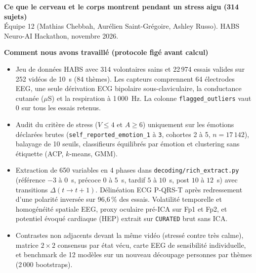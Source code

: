 \documentclass[10pt]{article}
\begin{document}
{\large\bfseries Ce que le cerveau et le corps montrent pendant un stress aigu (314 sujets)}\\[1pt]
{\footnotesize Équipe 12 (Mathias Chebbah, Aurélien Saint-Grégoire, Ashley Russo). HABS Neuro-AI Hackathon, novembre 2026.}

\smallskip
\noindent{}

\smallskip
{\small\textbf{Comment nous avons travaillé (protocole figé avant calcul)}
\begin{itemize}
\item Jeu de données HABS avec 314 volontaires sains et 22\,974 essais valides sur 252 vidéos de 10~s (84 thèmes). Les capteurs comprennent 64 électrodes EEG, une seule dérivation ECG bipolaire sous-claviculaire, la conductance cutanée ($\mu$S) et la respiration à 1\,000~Hz. La colonne \texttt{flagged\_outliers} vaut 0 sur tous les essais retenus.
\item Audit du critère de stress ($V \le 4$ et $A \ge 6$) uniquement sur les émotions déclarées brutes (\texttt{self\_reported\_emotion\_1} à \texttt{3}, cohortes 2 à 5, $n = 17\,142$), balayage de 10 seuils, classifieurs équilibrés par émotion et clustering sans étiquette (ACP, $k$-means, GMM).
\item Extraction de 650 variables en 4 phases dans \texttt{decoding/rich\_extract.py} (référence $-3$ à $0$~s, précoce $0$ à $5$~s, tardif $5$ à $10$~s, post $10$ à $12$~s) avec transitions $\Delta(t\to t+1)$. Délinéation ECG P-QRS-T après redressement d'une polarité inversée sur 96,6\,\% des essais. Volatilité temporelle et homogénéité spatiale EEG, proxy oculaire pré-ICA sur Fp1 et Fp2, et potentiel évoqué cardiaque (HEP) extrait sur \texttt{CURATED} brut sans ICA.
\item Contrastes non adjacents devant la même vidéo (stressé contre très calme), matrice $2 \times 2$ consensus par état vécu, carte EEG de sensibilité individuelle, et benchmark de 12 modèles sur un nouveau découpage personnes par thèmes (2\,000 bootstraps).
\end{itemize}}
\end{document}

